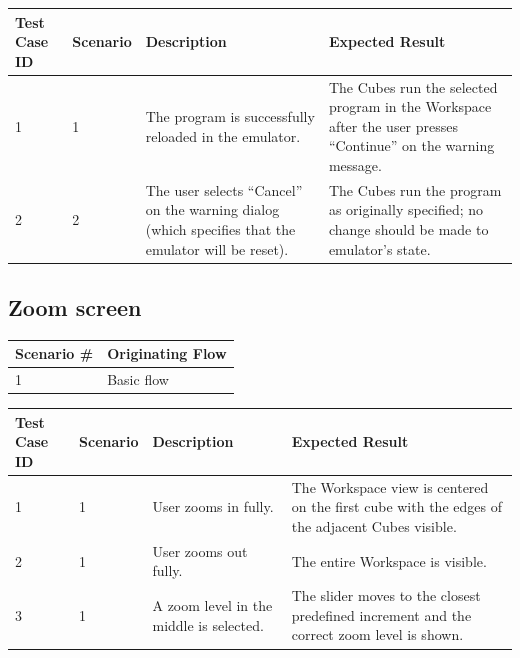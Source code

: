 \documentclass[12pt]{article}
\begin{document}
\begin{table}[h!]
  \begin{tabular}{p{.5in} | p{.75in} | p{2.15in} | p{2.15in}}
    \textbf{Test Case ID} &
    \textbf{Scenario} &
    \textbf{Description} &
    \textbf{Expected Result} \\ \hline

    1 &
    1 &
    The program is successfully reloaded in the emulator. &
    The Cubes run the selected program in the Workspace after the user presses ``Continue'' on the warning message. \\ \hline

    2 &
    2 &
    The user selects ``Cancel'' on the warning dialog (which specifies that the emulator will be reset). &
    The Cubes run the program as originally specified; no change should be made to emulator's state. \\ \hline

  \end{tabular}
\end{table}

\subsection{Zoom screen}

\begin{table}[h!]
  \begin{tabular}{l | l}
    \textbf{Scenario \#} &
    \textbf{Originating Flow} \\ \hline

    1 &
    Basic flow \\ \hline

  \end{tabular}
\end{table}

\begin{table}[h!]
  \begin{tabular}{p{.5in} | p{.75in} | p{2.15in} | p{2.15in}}
    \textbf{Test Case ID} &
    \textbf{Scenario} &
    \textbf{Description} &
    \textbf{Expected Result} \\ \hline

    1 &
    1 &
    User zooms in fully. &
    The Workspace view is centered on the first cube with the edges of the adjacent Cubes visible. \\ \hline

    2 &
    1 &
    User zooms out fully. &
    The entire Workspace is visible. \\ \hline

    3 &
    1 &
    A zoom level in the middle is selected. &
    The slider moves to the closest predefined increment and the correct zoom level is shown. \\ \hline

  \end{tabular}
\end{table}
\end{document}

